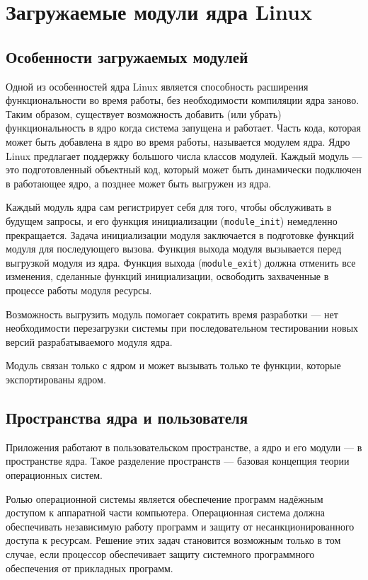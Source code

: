\section{Загружаемые модули ядра Linux}

\subsection{Особенности загружаемых модулей}

Одной из особенностей ядра Linux является способность расширения функциональности во время работы, без необходимости компиляции ядра заново. Таким образом, существует возможность добавить (или убрать) функциональность в ядро когда система запущена и работает. Часть кода, которая может быть добавлена в ядро во время работы, называется модулем ядра. Ядро Linux предлагает поддержку большого числа классов модулей. Каждый модуль --- это подготовленный объектный код, который может быть динамически подключен в работающее ядро, а позднее может быть выгружен из ядра.

Каждый модуль ядра сам регистрирует себя для того, чтобы обслуживать в будущем запросы, и его функция инициализации (\texttt{module\_init}) немедленно прекращается. Задача инициализации модуля заключается в подготовке функций модуля для последующего вызова. Функция выхода модуля вызывается перед выгрузкой модуля из ядра. Функция выхода (\texttt{module\_exit}) должна отменить все изменения, сделанные функций инициализации, освободить захваченные в процессе работы модуля ресурсы. 

Возможность выгрузить модуль помогает сократить время разработки --- нет необходимости перезагрузки системы при последовательном тестировании новых версий разрабатываемого модуля ядра.

Модуль связан только с ядром и может вызывать только те функции, которые экспортированы ядром.

\subsection{Пространства ядра и пользователя}

Приложения работают в пользовательском пространстве, а ядро и его модули --- в пространстве ядра. Такое разделение пространств --- базовая концепция теории операционных систем.

Ролью операционной системы является обеспечение программ надёжным доступом к аппаратной части компьютера. Операционная система должна обеспечивать независимую работу программ и защиту от несанкционированного доступа к ресурсам. Решение этих задач становится возможным только в том случае, если процессор обеспечивает защиту системного программного обеспечения от прикладных программ.

